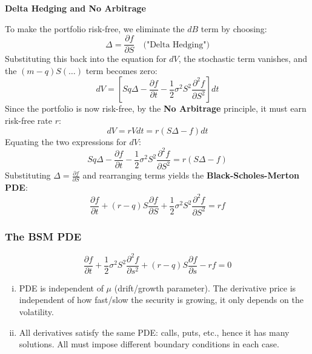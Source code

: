 \textbf{Delta Hedging and No Arbitrage}

To make the portfolio risk-free, we eliminate the \(dB\) term by choosing:
\begin{equation*}
    \Delta = \frac{\partial f}{\partial S} \quad \text{("Delta Hedging")}
\end{equation*}
Substituting this back into the equation for \(dV\), the stochastic term vanishes, and the \((m-q)S(\dots)\) term becomes zero:
\begin{equation*}
    dV = \left[ Sq\Delta - \frac{\partial f}{\partial t} - \frac{1}{2}\sigma^2 S^2 \frac{\partial^2 f}{\partial S^2} \right] dt
\end{equation*}
Since the portfolio is now risk-free, by the \textbf{No Arbitrage} principle, it must earn risk-free rate \(r\):
\begin{equation*}
    dV = r V dt = r(S\Delta - f) dt
\end{equation*}
Equating the two expressions for \(dV\):
\begin{equation*}
    Sq\Delta - \frac{\partial f}{\partial t} - \frac{1}{2}\sigma^2 S^2 \frac{\partial^2 f}{\partial S^2} = r(S\Delta - f)
\end{equation*}
Substituting \(\Delta = \frac{\partial f}{\partial S}\) and rearranging terms yields the \textbf{Black-Scholes-Merton PDE}:
\begin{equation*}
    \boxed{\frac{\partial f}{\partial t} + (r-q)S \frac{\partial f}{\partial S} + \frac{1}{2}\sigma^2 S^2 \frac{\partial^2 f}{\partial S^2} = rf}
\end{equation*}

\subsubsection{The BSM PDE}
\begin{equation*}
    \boxed{\frac{\partial f}{\partial t} + \frac{1}{2}\sigma^2 S^2 \frac{\partial^2f}{\partial s^2} + (r-q)S\frac{\partial f}{\partial s} - rf = 0}
\end{equation*}
\begin{enumerate}[i.]
    \item PDE is independent of \(\mu\) (drift/growth parameter). The derivative price is independent of how fast/slow the security is growing, it only depends on the volatility.

    \item All derivatives satisfy the same PDE: calls, puts, etc., hence it has many solutions. All must impose different boundary conditions in each case.
\end{enumerate}

